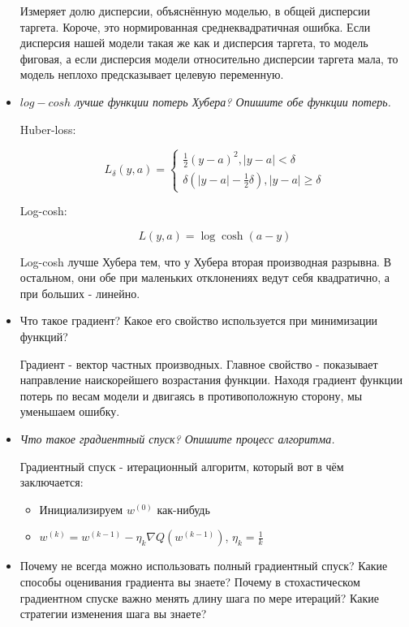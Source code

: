 \documentclass[a4paper]{article}
\begin{document}
\begin{itemize}
Измеряет долю дисперсии, объяснённую моделью, в общей дисперсии таргета. Короче, это нормированная среднеквадратичная ошибка. Если дисперсия нашей модели такая же как и дисперсия таргета, то модель фиговая, а если дисперсия модели относительно дисперсии таргета мала, то модель неплохо предсказывает целевую переменную.

\item \textit{$log-cosh$ лучше функции потерь Хубера? Опишите обе функции потерь.}

Huber-loss:

\[ L_\delta(y, a) = \begin{cases}
\frac{1}{2} (y-a)^2, |y-a| < \delta \\
\delta \left( |y-a| - \frac{1}{2} \delta \right), |y-a| \geq \delta
\end{cases} \]

Log-cosh:

\[ L(y, a) = \log \cosh (a-y) \]

Log-cosh лучше Хубера тем, что у Хубера вторая производная разрывна. В остальном, они обе при маленьких отклонениях ведут себя квадратично, а при больших - линейно.

\item Что такое градиент? Какое его свойство используется при минимизации функций?

Градиент - вектор частных производных. Главное свойство - показывает направление наискорейшего возрастания функции. Находя градиент функции потерь по весам модели и двигаясь в противоположную сторону, мы уменьшаем ошибку.

\item \textit{Что такое градиентный спуск? Опишите процесс алгоритма.}

Градиентный спуск - итерационный алгоритм, который вот в чём заключается:

\begin{itemize}

\item Инициализируем $w^{(0)}$ как-нибудь

\item $w^{(k)} = w^{(k-1)} - \eta_k \nabla Q(w^{(k-1)})$, $\eta_k = \frac{1}{k}$

\end{itemize}

\item  Почему не всегда можно использовать полный градиентный спуск? Какие способы
оценивания градиента вы знаете? Почему в стохастическом градиентном спуске важно
менять длину шага по мере итераций? Какие стратегии изменения шага вы знаете?


\end{itemize}
\end{document}
